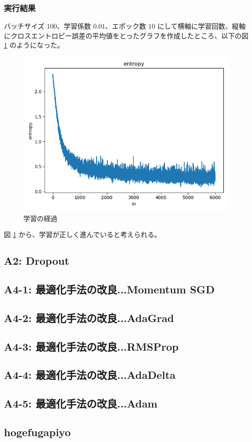 \documentclass[a4paper,dvipdfmx]{jsarticle}
\begin{document}
\subsubsection*{実行結果}

バッチサイズ $100$、学習係数 $0.01$、エポック数 $10$ にして横軸に学習回数、縦軸にクロスエントロピー誤差の平均値をとったグラフを作成したところ、以下の図 \ref{fig-A-1-1} のようになった。

\begin{figure}[H]
\centering
\includegraphics[width=12cm]{report_ReLU10epoch.png}
\caption{学習の経過}
\label{fig-A-1-1}
\end{figure}

図 \ref{fig-A-1-1} から、学習が正しく進んでいると考えられる。

\subsection*{A2: Dropout}

\subsection*{A4-1: 最適化手法の改良...Momentum SGD}

\subsection*{A4-2: 最適化手法の改良...AdaGrad}

\subsection*{A4-3: 最適化手法の改良...RMSProp}

\subsection*{A4-4: 最適化手法の改良...AdaDelta}

\subsection*{A4-5: 最適化手法の改良...Adam}

\subsection*{hogefugapiyo}
\end{document}
